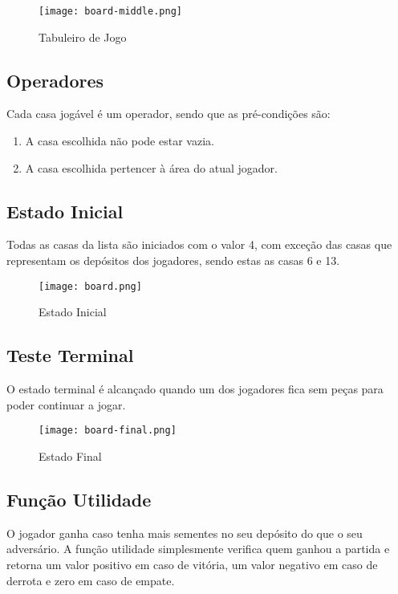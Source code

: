 \documentclass[conference]{IEEEtran}
\begin{document}
\begin{figure}[htbp]
    \centerline{\texttt{[image: board-middle.png]}}
    \caption{Tabuleiro de Jogo}
    \label{img2}
\end{figure}

\subsection{Operadores}
Cada casa jog\'avel \'e um operador, sendo que as pr\'e-condi\c c\~oes s\~ao:
\begin{enumerate}
\item A casa escolhida n\~ao pode estar vazia.
\item A casa escolhida pertencer \`a \'area do atual jogador.
\end{enumerate}


\subsection{Estado Inicial}
Todas as casas da lista s\~ao iniciados com o valor 4, com exce\c c\~ao das casas que representam os dep\'ositos dos jogadores, sendo estas as casas 6 e 13.

\begin{figure}[htbp]
    \centerline{\texttt{[image: board.png]}}
    \caption{Estado Inicial}
    \label{img4}
\end{figure}


\subsection{Teste Terminal}
O estado terminal \'e alcan\c cado quando um dos jogadores fica sem pe\c cas para poder continuar a jogar.\\

\begin{figure}[htbp]
    \centerline{\texttt{[image: board-final.png]}}
    \caption{Estado Final}
    \label{img5}
\end{figure}

\subsection{Fun\c c\~ao Utilidade}
O jogador ganha caso tenha mais sementes no seu dep\'osito do que o seu advers\'ario. A fun\c c\~ao utilidade simplesmente verifica quem ganhou a partida e retorna um valor positivo em caso de vit\'oria, um valor negativo em caso de derrota e zero em caso de empate.
\end{document}
